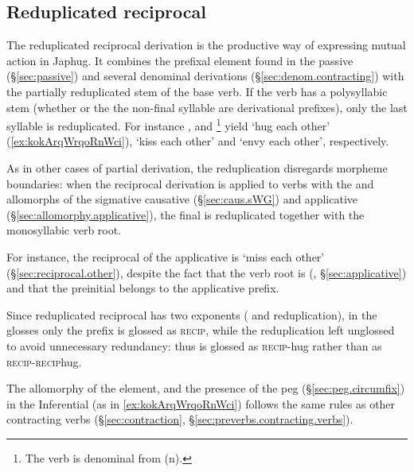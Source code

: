 \subsection{Reduplicated reciprocal} \label{sec:redp.reciprocal}
 
The reduplicated reciprocal derivation is the productive way of expressing mutual action in Japhug. It combines the  prefixal element found in the passive (§\ref{sec:passive}) and several denominal derivations (§\ref{sec:denom.contracting}) with the partially reduplicated stem of the base verb. If the verb has a polysyllabic stem (whether or the the non-final syllable are derivational prefixes), only the last syllable is reduplicated. For instance ,   and \footnote{The verb  is denominal from  (n). } yield  `hug each other'  (\ref{ex:kokArqWrqoRnWci}),  `kiss each other' and  `envy each other', respectively. 

As in other cases of partial derivation, the reduplication disregards morpheme boundaries: when the reciprocal derivation is applied to verbs with the  and  allomorphs of the sigmative causative (§\ref{sec:caus.sWG}) and applicative (§\ref{sec:allomorphy.applicative}), the final  is reduplicated together with the monosyllabic verb root. 

For instance, the reciprocal of the applicative  is  `miss each other' (§\ref{sec:reciprocal.other}), despite the fact that the verb root is  (, §\ref{sec:applicative}) and that the preinitial  belongs to the applicative prefix. 

Since reduplicated reciprocal has two exponents ( and reduplication), in the glosses only the  prefix is glossed as \textsc{recip}, while the reduplication left unglossed to avoid unnecessary redundancy: thus  is glossed as \textsc{recip}-hug rather than as \textsc{recip}-\textsc{recip}\redp{}hug. 

The  allomorphy of the  element, and the presence of the peg  (§\ref{sec:peg.circumfix}) in the Inferential (as in \ref{ex:kokArqWrqoRnWci}) follows the same rules as other contracting verbs (§\ref{sec:contraction}, §\ref{sec:preverbs.contracting.verbs}).

